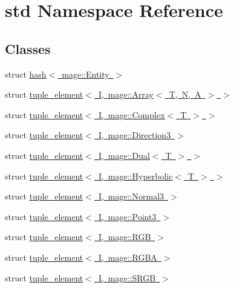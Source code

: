 \hypertarget{namespacestd}{}\section{std Namespace Reference}
\label{namespacestd}
\subsection*{Classes}
\begin{DoxyCompactItemize}
\item 
struct \mbox{\hyperlink{structstd_1_1hash_3_01mage_1_1_entity_01_4}{hash$<$ mage\+::\+Entity $>$}}
\item 
struct \mbox{\hyperlink{structstd_1_1tuple__element_3_01_i_00_01mage_1_1_array_3_01_t_00_01_n_00_01_a_01_4_01_4}{tuple\+\_\+element$<$ I, mage\+::\+Array$<$ T, N, A $>$ $>$}}
\item 
struct \mbox{\hyperlink{structstd_1_1tuple__element_3_01_i_00_01mage_1_1_complex_3_01_t_01_4_01_4}{tuple\+\_\+element$<$ I, mage\+::\+Complex$<$ T $>$ $>$}}
\item 
struct \mbox{\hyperlink{structstd_1_1tuple__element_3_01_i_00_01mage_1_1_direction3_01_4}{tuple\+\_\+element$<$ I, mage\+::\+Direction3 $>$}}
\item 
struct \mbox{\hyperlink{structstd_1_1tuple__element_3_01_i_00_01mage_1_1_dual_3_01_t_01_4_01_4}{tuple\+\_\+element$<$ I, mage\+::\+Dual$<$ T $>$ $>$}}
\item 
struct \mbox{\hyperlink{structstd_1_1tuple__element_3_01_i_00_01mage_1_1_hyperbolic_3_01_t_01_4_01_4}{tuple\+\_\+element$<$ I, mage\+::\+Hyperbolic$<$ T $>$ $>$}}
\item 
struct \mbox{\hyperlink{structstd_1_1tuple__element_3_01_i_00_01mage_1_1_normal3_01_4}{tuple\+\_\+element$<$ I, mage\+::\+Normal3 $>$}}
\item 
struct \mbox{\hyperlink{structstd_1_1tuple__element_3_01_i_00_01mage_1_1_point3_01_4}{tuple\+\_\+element$<$ I, mage\+::\+Point3 $>$}}
\item 
struct \mbox{\hyperlink{structstd_1_1tuple__element_3_01_i_00_01mage_1_1_r_g_b_01_4}{tuple\+\_\+element$<$ I, mage\+::\+R\+G\+B $>$}}
\item 
struct \mbox{\hyperlink{structstd_1_1tuple__element_3_01_i_00_01mage_1_1_r_g_b_a_01_4}{tuple\+\_\+element$<$ I, mage\+::\+R\+G\+B\+A $>$}}
\item 
struct \mbox{\hyperlink{structstd_1_1tuple__element_3_01_i_00_01mage_1_1_s_r_g_b_01_4}{tuple\+\_\+element$<$ I, mage\+::\+S\+R\+G\+B $>$}}
\item 

\end{DoxyCompactItemize}

